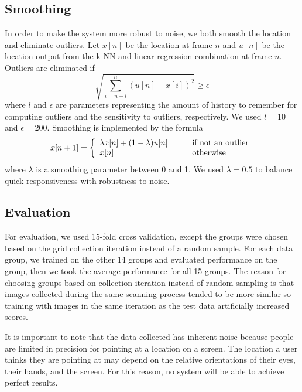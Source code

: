 \documentclass[10pt,twocolumn,letterpaper]{article}
\begin{document}
\subsection{Smoothing}
In order to make the system more robust to noise, we both smooth the location and eliminate outliers. Let $x[n]$ be the location at frame $n$ and $u[n]$ be the location output from the k-NN and linear regression combination at frame $n$. Outliers are eliminated if
\begin{equation}
	\sqrt{\sum_{i=n-l}^{n}(u[n]-x[i])^2} \geq \epsilon
\end{equation}
where $l$ and $\epsilon$ are parameters representing the amount of history to remember for computing outliers and the sensitivity to outliers, respectively. We used $l=10$ and $\epsilon=200$. Smoothing is implemented by the formula 
\begin{equation}
	x[n+1] = \left\{
		\begin{array}{l l}
			\lambda x[n] + (1-\lambda)u[n] & \qquad \text{if not an outlier} \\
			x[n] & \qquad \text{otherwise}
		\end{array}
	\right.
\end{equation}
 where $\lambda$ is a smoothing parameter between 0 and 1. We used $\lambda=0.5$ to balance quick responsiveness with robustness to noise.
 
\subsection{Evaluation}
For evaluation, we used 15-fold cross validation, except the groups were chosen based on the grid collection iteration instead of a random sample.  For each data group, we trained on the other 14 groups and evaluated performance on the group, then we took the average performance for all 15 groups.  The reason for choosing groups based on collection iteration instead of random sampling is that images collected during the same scanning process tended to be more similar so training with images in the same iteration as the test data artificially increased scores.

It is important to note that the data collected has inherent noise because people are limited in precision for pointing at a location on a screen.  The location a user thinks they are pointing at may depend on the relative orientations of their eyes, their hands, and the screen.  For this reason, no system will be able to achieve perfect results.
\end{document}
